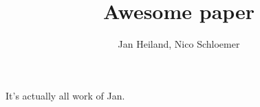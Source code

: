 \documentclass[a4paper,10pt]{article}
\title{Awesome paper}
\author{Jan Heiland, Nico Schloemer}
\begin{document}
It's actually all work of Jan.
\maketitle
\tableofcontents

\section{}



\end{document}
